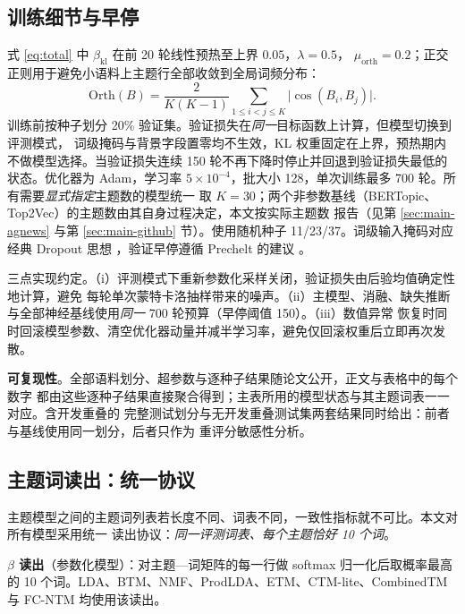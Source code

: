 \documentclass[11pt]{ctexart}
\newcommand{\fcntm}{FC-NTM}
\begin{document}
\subsection{训练细节与早停}

式 \eqref{eq:total} 中 $\beta_{\mathrm{kl}}$ 在前 20 轮线性预热至上界 $0.05$，$\lambda=0.5$，
$\mu_{\mathrm{orth}}=0.2$；正交正则用于避免小语料上主题行全部收敛到全局词频分布：
\begin{equation}
\mathrm{Orth}(B)=\frac{2}{K(K-1)}\sum_{1\le i<j\le K}\big|\cos(B_i,B_j)\big| .
\end{equation}
训练前按种子划分 20\% 验证集。验证损失在\emph{同一}目标函数上计算，但模型切换到评测模式，
词级掩码与背景字段置零均不生效，KL 权重固定在上界，预热期内不做模型选择。当验证损失连续
150 轮不再下降时停止并回退到验证损失最低的状态。优化器为 Adam，学习率
$5\times10^{-4}$，批大小 128，单次训练最多 700 轮。所有需要\emph{显式指定}主题数的模型统一
取 $K=30$；两个非参数基线（BERTopic、Top2Vec）的主题数由其自身过程决定，本文按实际主题数
报告（见第 \ref{sec:main-agnews} 与第 \ref{sec:main-github} 节）。使用随机种子
11/23/37。词级输入掩码对应经典 Dropout 思想 \cite{srivastava2014dropout}，验证早停遵循
Prechelt 的建议 \cite{prechelt1998early}。

三点实现约定。（i）评测模式下重新参数化采样关闭，验证损失由后验均值确定性地计算，避免
每轮单次蒙特卡洛抽样带来的噪声。（ii）主模型、消融、缺失推断与全部神经基线使用\emph{同一}
700 轮预算（早停阈值 150）。（iii）数值异常
恢复时同时回滚模型参数、清空优化器动量并减半学习率，避免仅回滚权重后立即再次发散。

\textbf{可复现性}。全部语料划分、超参数与逐种子结果随论文公开，正文与表格中的每个数字
都由这些逐种子结果直接聚合得到；主表所用的模型状态与其主题词表一一对应。含开发重叠的
完整测试划分与无开发重叠测试集两套结果同时给出：前者与基线使用同一划分，后者只作为
重评分敏感性分析。

\subsection{主题词读出：统一协议}

主题模型之间的主题词列表若长度不同、词表不同，一致性指标就不可比。本文对所有模型采用统一
读出协议：\emph{同一评测词表、每个主题恰好 10 个词}。

\textbf{$\beta$ 读出}（参数化模型）：对主题—词矩阵的每一行做 softmax 归一化后取概率最高的
10 个词。LDA、BTM、NMF、ProdLDA、ETM、CTM-lite、CombinedTM 与 \fcntm{} 均使用该读出。
\end{document}
